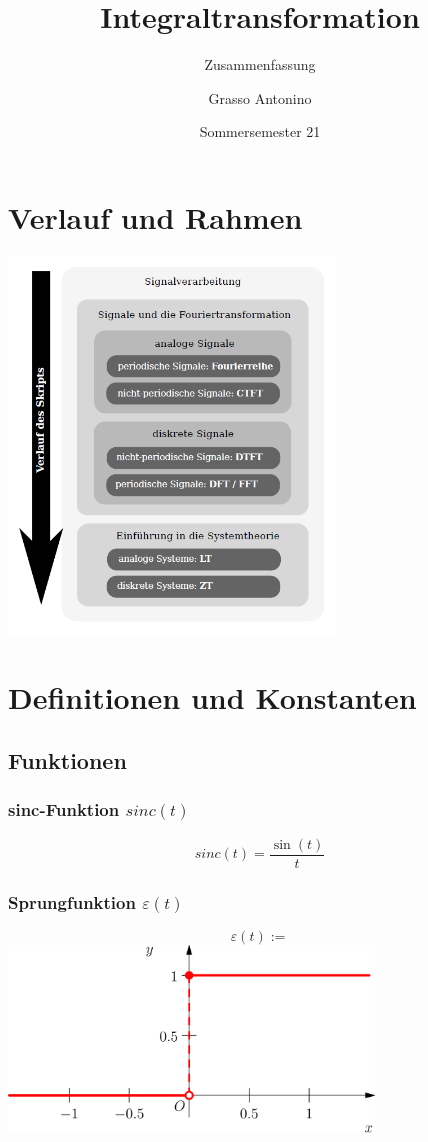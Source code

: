 \documentclass[12pt,a4paper]{scrartcl}
\title{Integraltransformation}
\subtitle{Zusammenfassung}
\author{Grasso Antonino}
\date{Sommersemester 21}
\begin{document}
\begin{titlepage}
\maketitle
\vspace{100px}

\end{titlepage}

\tableofcontents
\newpage


\section{Verlauf und Rahmen}
\label{sec:verlauf-und-rahmen}
\includegraphics[height=10cm]{Pictures/Verlauf.png}

\section{Definitionen und Konstanten}
\label{sec:definitionen-und-konstanten}

\subsection{Funktionen}
\label{sec:sub:funktionen}
\subsubsection{sinc-Funktion $sinc(t)$}
\label{sec:sub:sub:sinc-funktion}
$$sinc(t) = \frac{\sin(t)}{t}$$
\subsubsection{Sprungfunktion $\varepsilon(t)$}
\label{sec:sub:sub:sprungfunktion}
$$\varepsilon(t) := $$ \includegraphics[height=5cm]{Pictures/Heaviside.svg.png}
\end{document}
